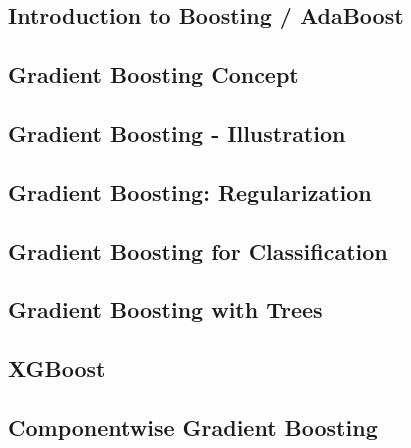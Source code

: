 




\subsection{Introduction to Boosting / AdaBoost}


\subsection{Gradient Boosting Concept}


\subsection{Gradient Boosting - Illustration}


\subsection{Gradient Boosting: Regularization}


\subsection{Gradient Boosting for Classification}


\subsection{Gradient Boosting with Trees}


\subsection{XGBoost}


\subsection{Componentwise Gradient Boosting}










